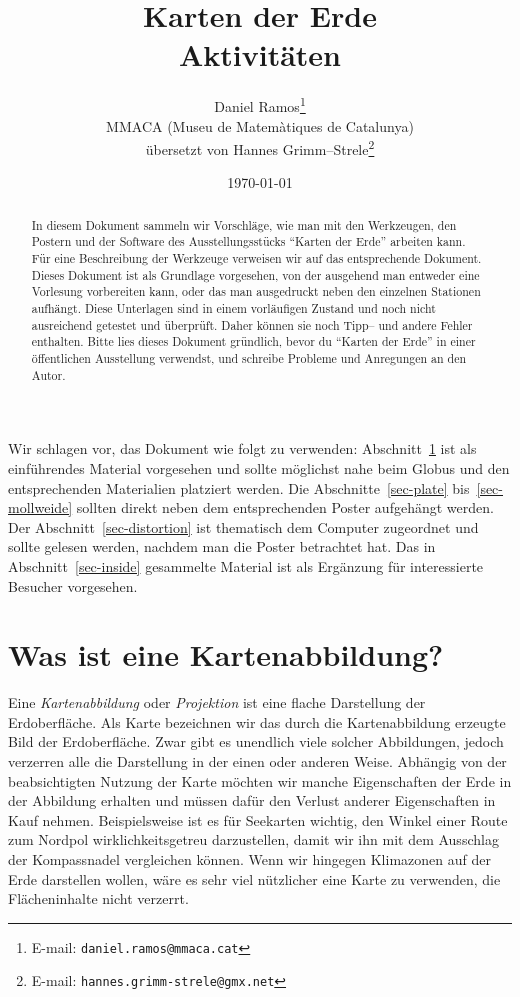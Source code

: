\documentclass[a4paper,12pt]{article}
\title{Karten der Erde \\ Aktivitäten}
\author{Daniel Ramos\footnote{E-mail: \texttt{daniel.ramos@mmaca.cat}}
        \\MMACA (Museu de Matemàtiques de Catalunya)
        \\übersetzt von Hannes Grimm--Strele\footnote{E-mail: \texttt{hannes.grimm-strele@gmx.net}}}
\date{\today}
\begin{document}
\maketitle

\begin{abstract}
  In diesem Dokument sammeln wir Vorschläge, wie man mit den Werkzeugen, den Postern
  und der Software des Ausstellungsstücks "`Karten der Erde"' arbeiten kann. Für eine 
  Beschreibung der Werkzeuge verweisen wir auf das entsprechende Dokument.
  Dieses Dokument ist als Grundlage vorgesehen, von der ausgehend man entweder eine 
  Vorlesung vorbereiten kann, oder das man ausgedruckt neben den einzelnen Stationen
  aufhängt. Diese Unterlagen sind in einem vorläufigen 
  Zustand und noch nicht ausreichend getestet und überprüft. Daher können sie noch
  Tipp-- und andere Fehler enthalten. Bitte lies dieses Dokument gründlich, 
  bevor du "`Karten der Erde"' in einer öffentlichen Ausstellung verwendst, und 
  schreibe Probleme und Anregungen an den Autor.
\end{abstract}


Wir schlagen vor, das Dokument wie folgt zu verwenden: Abschnitt~\ref{sec-map} ist als
ein\-führ\-en\-des Material vorgesehen und sollte möglichst nahe beim Globus und den 
entsprechenden Materialien platziert werden. Die Abschnitte~\ref{sec-plate} 
bis~\ref{sec-mollweide} sollten direkt neben dem entsprechenden Poster aufgehängt 
werden. Der Abschnitt~\ref{sec-distortion} ist thematisch dem Computer zugeordnet und 
sollte gelesen werden, nachdem man die Poster betrachtet hat. Das in 
Abschnitt~\ref{sec-inside} gesammelte Material ist als Ergänzung für interessierte 
Besucher vorgesehen.



\newpage
\section{Was ist eine Kartenabbildung?}
\label{sec-map}

Eine \emph{Kartenabbildung} oder \emph{Projektion} ist eine flache Darstellung der 
Erdoberfläche. Als Karte bezeichnen wir das durch die Kartenabbildung erzeugte Bild 
der Erdoberfläche. Zwar gibt es unendlich viele solcher Abbildungen, jedoch verzerren 
alle die Darstellung in der einen oder anderen Weise. Abhängig von der beabsichtigten 
Nutzung der Karte möchten wir manche Eigenschaften der Erde in der Abbildung erhalten und 
müssen dafür den Verlust anderer Eigenschaften in Kauf nehmen. Beispielsweise ist es für 
Seekarten wichtig, den Winkel einer Route zum Nordpol wirklichkeitsgetreu darzustellen,
damit wir ihn mit dem Ausschlag der Kompassnadel vergleichen können. Wenn wir hingegen 
Klimazonen auf der Erde darstellen wollen, wäre es sehr viel nützlicher eine Karte 
zu verwenden, die Flächeninhalte nicht verzerrt.
\end{document}
